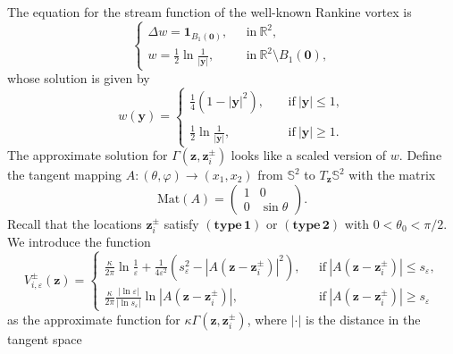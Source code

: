 \documentclass[12pt,reqno]{amsart}
\numberwithin{equation}{section}
\theoremstyle{definition}
\theoremstyle{remark}
\begin{document}
	The equation for the stream function of the well-known Rankine vortex is 
	\begin{equation*}
		\begin{cases}
			\Delta w=\boldsymbol{1}_{B_1(\boldsymbol 0)},  \ \ \ & \text{in} \ \mathbb R^2,\\
			w=\frac{1}{2}\ln\frac{1}{|\boldsymbol y|}, &\text{in} \ \mathbb R^2\setminus B_{1}(\boldsymbol 0),
		\end{cases}
	\end{equation*}
	whose solution is given by
	\begin{equation*}
		w(\boldsymbol y)=\left\{
		\begin{array}{lll}
			\frac{1}{4}(1-|\boldsymbol y|^2), \ \ \ \ \ &\mathrm{if} \ |\boldsymbol y|\le 1,\\
			\\
			\frac{1}{2}\ln\frac{1}{|\boldsymbol y|}, &\mathrm{if} \ |\boldsymbol y|\ge 1.
		\end{array}
		\right.
	\end{equation*}
	The approximate solution for $\Gamma(\boldsymbol z, \boldsymbol z_i^\pm)$ looks like a scaled version of $w$. 
	Define the tangent mapping $A: (\theta,\varphi)\to (x_1,x_2)$ from $\mathbb S^2$ to $T_{\boldsymbol z}{\mathbb S^2}$ with the matrix
	\begin{equation*}
		\mathrm{Mat}(A)=\left(
		\begin{array}{ccc}
			1 & 0             \\
			0 & \sin\theta
		\end{array}
		\right).
	\end{equation*}
	Recall that the locations $\boldsymbol z_i^\pm$ satisfy $\mathbf{(type\, 1)}$ or $\mathbf{(type\, 2)}$ with $0<\theta_0<\pi/2$. We introduce the function 
	\begin{equation*}
		V^\pm_{i,\varepsilon}(\boldsymbol z)=\left\{
		\begin{array}{lll}
			\frac{\kappa}{2\pi}\ln\frac{1}{\varepsilon}+\frac{1}{4\varepsilon^2}(s_\varepsilon^2-|A(\boldsymbol z-\boldsymbol z^\pm_i)|^2), \ \ \ &\mathrm{if} \ |A(\boldsymbol z-\boldsymbol z^\pm_i)|\le s_\varepsilon,\\
			\frac{\kappa}{2\pi}\frac{|\ln\varepsilon|}{|\ln s_\varepsilon|}\ln|A(\boldsymbol z-\boldsymbol z^\pm_i)|,&\mathrm{if} \ |A(\boldsymbol z-\boldsymbol z^\pm_i)|\ge s_\varepsilon
		\end{array}
		\right.
	\end{equation*}
	as the approximate function for $\kappa\Gamma(\boldsymbol z, \boldsymbol z_i^\pm)$, where $|\cdot|$ is the distance in the tangent space 
\end{document}
